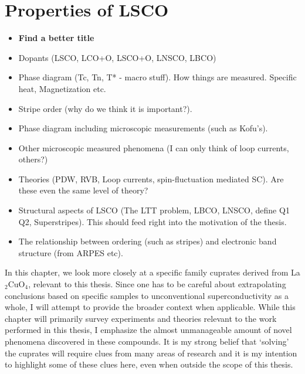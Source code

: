 \chapter{Properties of LSCO}

\begin{framed}
    \begin{itemize}
        \item \textbf{Find a better title}
        \item Dopants (LSCO, LCO+O, LSCO+O, LNSCO, LBCO)
        \item Phase diagram (Tc, Tn, T* - macro stuff). How things are measured. Specific heat, Magnetization etc.
        \item Stripe order (why do we think it is important?). 
        \item Phase diagram including microscopic measurements (such as Kofu's).
        \item Other microscopic measured phenomena (I can only think of loop currents, others?)
        \item Theories (PDW, RVB, Loop currents, spin-fluctuation mediated SC). Are these even the same level of theory?
        \item Structural aspects of LSCO (The LTT problem, LBCO, LNSCO, define Q1 Q2, Superstripes). This should feed right into the motivation of the thesis.
        \item The relationship between ordering (such as stripes) and electronic band structure (from ARPES etc).
    \end{itemize}
\end{framed}

In this chapter, we look more closely at a specific family cuprates derived from La$_2$CuO$_4$, relevant to this thesis. Since one has to be careful about extrapolating conclusions based on specific samples to unconventional superconductivity as a whole, I will attempt to provide the broader context when applicable. While this chapter will primarily survey experiments and theories relevant to the work performed in this thesis, I emphasize the almost unmanageable amount of novel phenomena discovered in these compounds. It is my strong belief that `solving' the cuprates will require clues from many areas of research and it is my intention to highlight some of these clues here, even when outside the scope of this thesis.